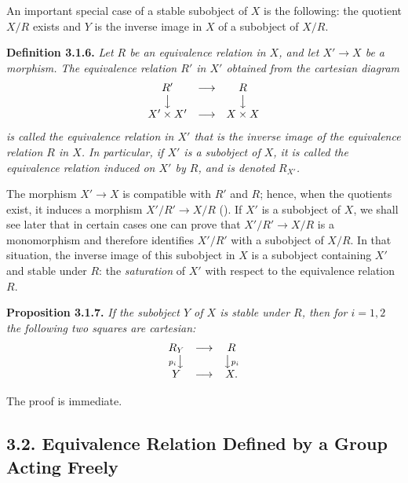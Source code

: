 An important special case of a stable subobject of \(X\) is the following:
the quotient \(X/R\) exists and \(Y\) is the inverse image in \(X\) of a
subobject of \(X/R\).

\medskip
\noindent{}\textbf{Definition 3.1.6.}
\textit{Let \(R\) be an equivalence relation in \(X\), and let \(X'\to X\)
be a morphism. The equivalence relation \(R'\) in \(X'\) obtained from the
cartesian diagram}
\[
  \begin{array}{ccc}
    R' & \longrightarrow & R\\
    \big\downarrow && \big\downarrow\\
    X'\times X' & \longrightarrow & X\times X
  \end{array}
\]
\textit{is called the equivalence relation in \(X'\) that is the
\emph{inverse image} of the equivalence relation \(R\) in \(X\). In
particular, if \(X'\) is a subobject of \(X\), it is called the equivalence
relation \emph{induced} on \(X'\) by \(R\), and is denoted \(R_{X'}\).}

The morphism \(X'\to X\) is compatible with \(R'\) and \(R\); hence, when
the quotients exist, it induces a morphism \(X'/R'\to X/R\) (). If
\(X'\) is a subobject of \(X\), we shall see later that in certain cases one
can prove that \(X'/R'\to X/R\) is a monomorphism and therefore identifies
\(X'/R'\) with a subobject of \(X/R\). In that situation, the inverse image
of this subobject in \(X\) is a subobject containing \(X'\) and stable under
\(R\): the \emph{saturation} of \(X'\) with respect to the equivalence
relation \(R\).

\medskip
\noindent{}\textbf{Proposition 3.1.7.}
\textit{If the subobject \(Y\) of \(X\) is stable under \(R\), then for
\(i=1,2\) the following two squares are cartesian:}
\[
  \begin{array}{ccc}
    R_Y & \longrightarrow & R\\
    {\scriptstyle p_i}\big\downarrow && \big\downarrow{\scriptstyle p_i}\\
    Y & \longrightarrow & X.
  \end{array}
\]

The proof is immediate.

\subsection*{3.2. Equivalence Relation Defined by a Group Acting Freely}

